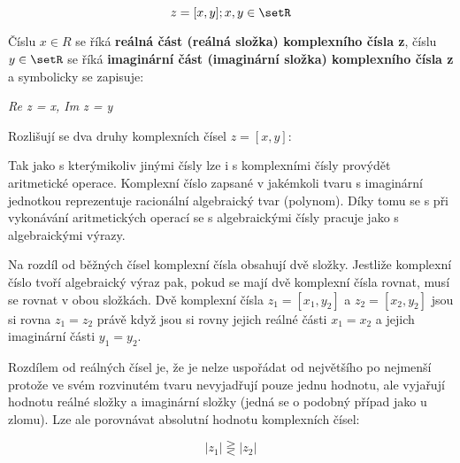$$ z = [x,y]; x,y \in \setR $$

Číslu $x \in R $ se říká {\bf reálná část (reálná složka) komplexního čísla z}, číslu $y \in \setR $ se říká {\bf imaginární část (imaginární složka) komplexního čísla z} a symbolicky se zapisuje:

\centerline{\it Re z = x, Im z = y}

Rozlišují se dva druhy komplexních čísel $z=[x,y]$:

\vskip 4mm







Tak jako s kterýmikoliv jinými čísly lze i s komplexními čísly provýdět aritmetické operace. Komplexní číslo zapsané v jakémkoli tvaru s imaginární jednotkou reprezentuje racionální algebraický tvar (polynom). Díky tomu se s při vykonávání aritmetických operací se s algebraickými čísly pracuje jako s algebraickými výrazy. 


Na rozdíl od běžných čísel komplexní čísla obsahují dvě složky. Jestliže komplexní číslo tvoří algebraický výraz pak, pokud se mají dvě komplexní čísla rovnat, musí se rovnat v obou složkách. Dvě komplexní čísla $z_1=[x_1,y_2]$ a $z_2=[x_2,y_2]$ jsou si rovna $ z_1=z_2$ právě když jsou si rovny jejich reálné části $x_1=x_2$ a jejich imaginární části $y_1 = y_2$. 

Rozdílem od reálných čísel je, že je nelze uspořádat od největšího po nejmenší protože ve svém rozvinutém tvaru nevyjadřují pouze jednu hodnotu, ale vyjařují hodnotu reálné složky a imaginární složky (jedná se o podobný případ jako u zlomu). Lze ale porovnávat absolutní hodnotu komplexních čísel:

$$ |z_1| \gtreqless |z_2| $$


